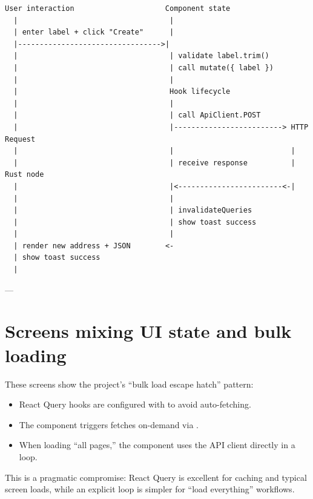 \begin{verbatim}
User interaction                     Component state
  |                                   |
  | enter label + click "Create"      |
  |--------------------------------->|
  |                                   | validate label.trim()
  |                                   | call mutate({ label })
  |                                   |
  |                                   Hook lifecycle
  |                                   |
  |                                   | call ApiClient.POST
  |                                   |-------------------------> HTTP Request
  |                                   |                           |
  |                                   | receive response          | Rust node
  |                                   |<------------------------<-|
  |                                   |
  |                                   | invalidateQueries
  |                                   | show toast success
  |                                   |
  | render new address + JSON        <-
  | show toast success
  |
\end{verbatim}

---

\section{Screens mixing UI state and bulk loading}
\label{sec:bulk-loading}

These screens show the project's ``bulk load escape hatch'' pattern:

\begin{itemize}
  \item React Query hooks are configured with  to avoid auto-fetching.
  \item The component triggers fetches on-demand via .
  \item When loading ``all pages,'' the component uses the API client directly in a loop.
\end{itemize}

This is a pragmatic compromise: React Query is excellent for caching and typical screen loads, while an explicit loop is simpler for ``load everything'' workflows.

